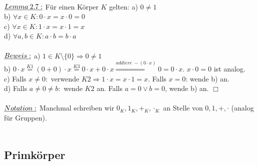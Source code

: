 \documentclass[fleqn, a4paper, 11pt]{article}
\begin{document}
\\
$\uline{Lemma\:2.7:}$ F\"ur einen K\"orper $K$ gelten: a) $0\neq 1$\\
b) $\forall x\in K: 0\cdot x=x\cdot 0=0$\\
c) $\forall x\in K: 1\cdot x=x\cdot1=x$\\
d) $\forall a,b\in K: a\cdot b=b\cdot a$\\
\\
$\uline{Beweis:}$ a) $1\in K\setminus\{0\}\Rightarrow 0\neq 1$\\
b) $0\cdot x\stackrel{K1}{=}(0+0)\cdot x\stackrel{K3}{=}0\cdot x+0\cdot x\stackrel{addiere\:-(0\cdot x)}{\Rightarrow} 0=0\cdot x$. $x\cdot 0=0$ ist analog.\\
c) Falls $x\neq0:$ verwende $K2\Rightarrow1\cdot x=x\cdot1=x$. Falls $x=0$: wende b) an.\\
d) Falls $a\neq0\neq b:$ wende $K2$ an. Falls $a=0\vee b=0$, wende b) an. \hfill $\Box$\\
\\
$\uline{Notation:}$ Manchmal schreiben wir $0_{K},1_{K},+_{K},\cdot_{K}$ an Stelle von $0,1,+,\cdot$ (analog f\"ur Gruppen).\\
\\
\subsection{Primk\"orper}
\end{document}
